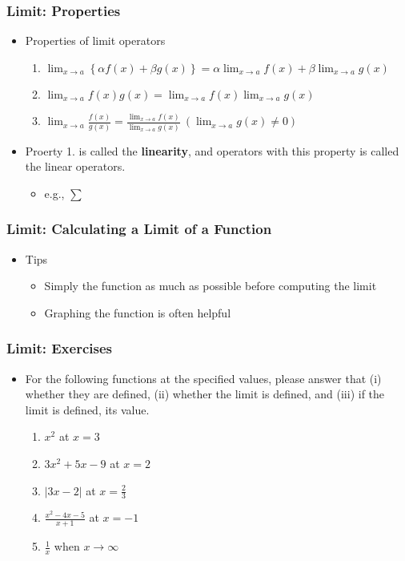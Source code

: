 \documentclass[pdflatex, 12pt]{beamer}
\begin{document}
\begin{frame}
\frametitle{Limit: Properties}
\begin{itemize}
\item Properties of limit operators
 \begin{enumerate}
 \item $\lim_{x \to a} \left\{\alpha f(x) + \beta g(x)\right\} = \alpha \lim_{x \to a} f(x) + \beta \lim_{x \to a} g(x)$
 \item $\lim_{x \to a} f(x)g(x) = \lim_{x \to a} f(x) \lim_{x \to a} g(x)$
 \item $\lim_{x \to a} \frac{f(x)}{g(x)} = \frac{\lim_{x \to a} f(x)}{\lim_{x \to a} g(x)} \ (\lim_{x \to a} g(x) \neq 0)$
 \end{enumerate}
\vspace{0.4cm}
\item Proerty 1. is called the \textbf{linearity}, and operators with this property is called the linear operators.
 \begin{itemize}
 \item e.g., $\sum$
 \end{itemize}
\end{itemize}
\end{frame}

\begin{frame}
\frametitle{Limit: Calculating a Limit of a Function}
\begin{itemize}
\item Tips
 \begin{itemize}
 \item Simply the function as much as possible before computing the limit
 \item Graphing the function is often helpful
 \end{itemize}
\end{itemize}
\end{frame}

\begin{frame}
\frametitle{Limit: Exercises}
\begin{itemize}
\item For the following functions at the specified values, please answer that (i) whether they are defined, (ii) whether the limit is defined, and (iii) if the limit is defined, its value.
 \begin{enumerate}
 \item $x^2$ at $x = 3$
 \item $3x^2 + 5x - 9$ at $x = 2$
 \item $|3x - 2|$ at $x = \frac{2}{3}$
 \vspace{0.1cm}
 \item $\frac{x^2 - 4x - 5}{x + 1}$ at $x = -1$
 \vspace{0.1cm}
 \item $\frac{1}{x}$ when $x \rightarrow \infty$
 \end{enumerate}
\end{itemize}
\end{frame}
\end{document}
